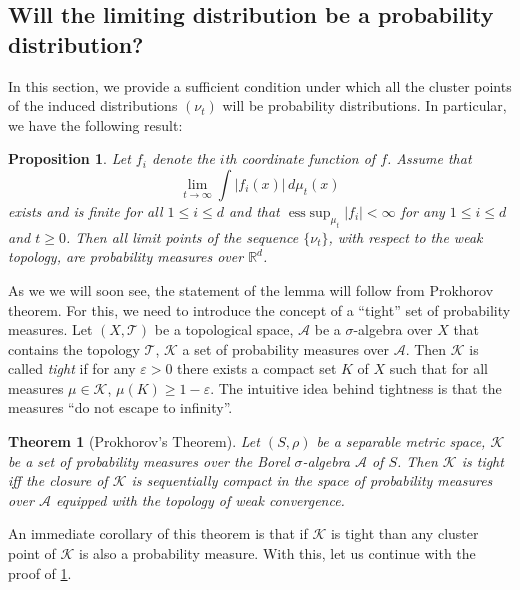 \documentclass[english]{article} %
\DeclareMathOperator{\esssup}{ess\;sup}
\newcommand{\real}{\mathbb{R}}
\newtheorem{thm}[lemma]{Theorem}
\newtheorem{prop}[lemma]{Proposition}
\theoremstyle{definition}
\newcommand{\TT}{\mathcal{T}}
\renewcommand{\AA}{\mathcal{A}}
\newcommand{\KK}{\mathcal{K}}
\newcommand{\eps}{\varepsilon}
\begin{document}
\subsection{Will the limiting distribution be a probability distribution?}
In this section, we provide a sufficient condition under which all the cluster points of the induced distributions $(\nu_t)$ will be probability distributions. In particular, we have the following result:
\begin{prop}
\label{lem:ergodicfunction}
Let $f_i$ denote the $i$th coordinate function of $f$.
Assume that
\begin{equation}
\label{eq:ergodicproperty}
\lim_{t\to\infty} \int |f_i(x)|\, d\mu_t(x) 
\end{equation}
exists and is finite for all $1 \le i \le d$ and that $\esssup_{\mu_t} |f_i|<\infty$ for any $1\le i \le d$ and $t\ge 0$.
Then all limit points of the sequence $\{\nu_t\}$, with respect to the weak topology, are probability measures over $\real^d$.
\end{prop}
As we we will soon see, the statement of the lemma will follow from Prokhorov theorem.
For this, we need to introduce the concept of a ``tight'' set of probability measures.
Let $(X,\TT)$ be a topological space, $\AA$ be a $\sigma$-algebra over $X$ that contains the topology $\TT$,
$\KK$ a set of probability measures over $\AA$. Then $\KK$ is called \emph{tight} if for any $\eps>0$ there exists a compact set $K$ of $X$ such that for all measures $\mu \in \KK$, $\mu(K)\ge 1-\eps$. The intuitive idea behind tightness is that the measures ``do not escape to infinity''.
\begin{thm}[Prokhorov's Theorem]
Let $(S,\rho)$ be a separable metric space, $\KK$ be a set of probability measures over the Borel $\sigma$-algebra $\AA$ of $S$.
Then $\KK$ is tight iff the closure of $\KK$ is sequentially compact in the space of probability measures over $\AA$ equipped with the topology of weak convergence.
\end{thm}
An immediate corollary of this theorem is that if $\KK$ is tight than any cluster point of $\KK$ is also a probability measure.
With this, let us continue with the proof of \cref{lem:ergodicfunction}.
\end{document}
